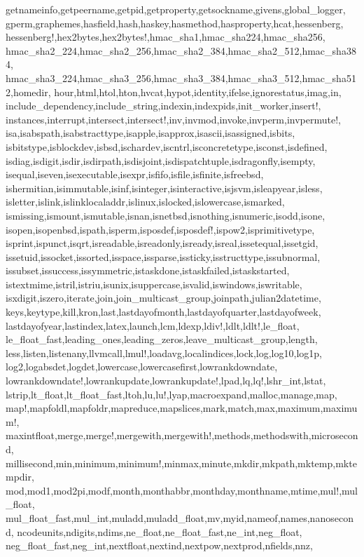 {{getnameinfo,getpeername,getpid,getproperty,getsockname,givens,global_logger,%
gperm,graphemes,hasfield,hash,haskey,hasmethod,hasproperty,hcat,hessenberg,%
hessenberg!,hex2bytes,hex2bytes!,hmac_sha1,hmac_sha224,hmac_sha256,%
hmac_sha2_224,hmac_sha2_256,hmac_sha2_384,hmac_sha2_512,hmac_sha384,%
hmac_sha3_224,hmac_sha3_256,hmac_sha3_384,hmac_sha3_512,hmac_sha512,homedir,%
hour,html,htol,hton,hvcat,hypot,identity,ifelse,ignorestatus,imag,in,%
include_dependency,include_string,indexin,indexpids,init_worker,insert!,%
instances,interrupt,intersect,intersect!,inv,invmod,invoke,invperm,invpermute!,%
isa,isabspath,isabstracttype,isapple,isapprox,isascii,isassigned,isbits,%
isbitstype,isblockdev,isbsd,ischardev,iscntrl,isconcretetype,isconst,isdefined,%
isdiag,isdigit,isdir,isdirpath,isdisjoint,isdispatchtuple,isdragonfly,isempty,%
isequal,iseven,isexecutable,isexpr,isfifo,isfile,isfinite,isfreebsd,%
ishermitian,isimmutable,isinf,isinteger,isinteractive,isjsvm,isleapyear,isless,%
isletter,islink,islinklocaladdr,islinux,islocked,islowercase,ismarked,%
ismissing,ismount,ismutable,isnan,isnetbsd,isnothing,isnumeric,isodd,isone,%
isopen,isopenbsd,ispath,isperm,isposdef,isposdef!,ispow2,isprimitivetype,%
isprint,ispunct,isqrt,isreadable,isreadonly,isready,isreal,issetequal,issetgid,%
issetuid,issocket,issorted,isspace,issparse,issticky,isstructtype,issubnormal,%
issubset,issuccess,issymmetric,istaskdone,istaskfailed,istaskstarted,%
istextmime,istril,istriu,isunix,isuppercase,isvalid,iswindows,iswritable,%
isxdigit,iszero,iterate,join,join_multicast_group,joinpath,julian2datetime,%
keys,keytype,kill,kron,last,lastdayofmonth,lastdayofquarter,lastdayofweek,%
lastdayofyear,lastindex,latex,launch,lcm,ldexp,ldiv!,ldlt,ldlt!,le_float,%
le_float_fast,leading_ones,leading_zeros,leave_multicast_group,length,%
less,listen,listenany,llvmcall,lmul!,loadavg,localindices,lock,log,log10,log1p,%
log2,logabsdet,logdet,lowercase,lowercasefirst,lowrankdowndate,%
lowrankdowndate!,lowrankupdate,lowrankupdate!,lpad,lq,lq!,lshr_int,lstat,%
lstrip,lt_float,lt_float_fast,ltoh,lu,lu!,lyap,macroexpand,malloc,manage,map,%
map!,mapfoldl,mapfoldr,mapreduce,mapslices,mark,match,max,maximum,maximum!,%
maxintfloat,merge,merge!,mergewith,mergewith!,methods,methodswith,microsecond,%
millisecond,min,minimum,minimum!,minmax,minute,mkdir,mkpath,mktemp,mktempdir,%
mod,mod1,mod2pi,modf,month,monthabbr,monthday,monthname,mtime,mul!,mul_float,%
mul_float_fast,mul_int,muladd,muladd_float,mv,myid,nameof,names,nanosecond,%
ncodeunits,ndigits,ndims,ne_float,ne_float_fast,ne_int,neg_float,%
neg_float_fast,neg_int,nextfloat,nextind,nextpow,nextprod,nfields,nnz,%
}}
